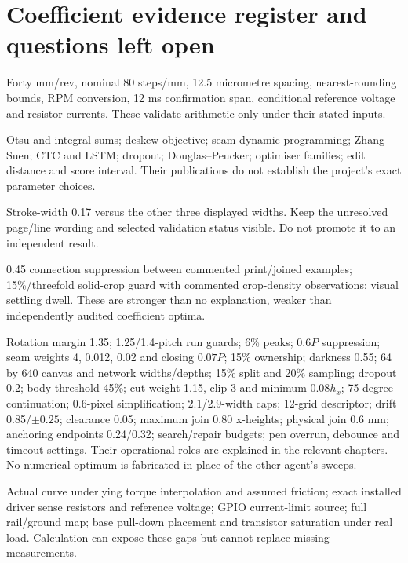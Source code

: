 \section{Coefficient evidence register and questions left open}
\begin{description}[style=nextline]
\item[Derived from stated geometry/electronics.] Forty mm/rev, nominal
80 steps/mm, 12.5 micrometre spacing, nearest-rounding bounds, RPM conversion,
12 ms confirmation span, conditional reference voltage and resistor currents.
These validate arithmetic only under their stated inputs.
\item[Published method, project constants.] Otsu and integral sums;
deskew objective; seam dynamic programming; Zhang--Suen; CTC and LSTM;
dropout; Douglas--Peucker; optimiser families; edit distance and score interval.
Their publications do not establish the project's exact parameter choices.
\item[Reported selection evidence.] Stroke-width 0.17 versus the other
three displayed widths. Keep the unresolved page/line wording and selected
validation status visible. Do not promote it to an independent result.
\item[Documented local rationale, not newly verified.] 0.45 connection
suppression between commented print/joined examples; 15\%/threefold solid-crop
guard with commented crop-density observations; visual settling dwell.
These are stronger than no explanation, weaker than independently audited
coefficient optima.
\item[Heuristics still lacking an established optimum.] Rotation margin
1.35; 1.25/1.4-pitch run guards; 6\% peaks; $0.6P$ suppression; seam
weights 4, 0.012, 0.02 and closing $0.07P$; 15\% ownership; darkness
0.55; 64 by 640 canvas and network widths/depths; 15\% split and 20\%
sampling; dropout 0.2; body threshold 45\%; cut weight 1.15, clip 3 and
minimum $0.08h_x$; 75-degree continuation; 0.6-pixel simplification;
2.1/2.9-width caps; 12-grid descriptor; drift 0.85/$\pm0.25$; clearance
0.05; maximum join 0.80 x-heights; physical join 0.6 mm; anchoring endpoints
0.24/0.32; search/repair budgets; pen overrun, debounce and timeout settings.
Their operational roles are explained in the relevant chapters. No numerical
optimum is fabricated in place of the other agent's sweeps.
\item[Unresolved physical/source facts.] Actual curve underlying torque
interpolation and assumed friction; exact installed driver sense resistors
and reference voltage; GPIO current-limit source; full rail/ground map;
base pull-down placement and transistor saturation under real load. Calculation
can expose these gaps but cannot replace missing measurements.
\end{description}

